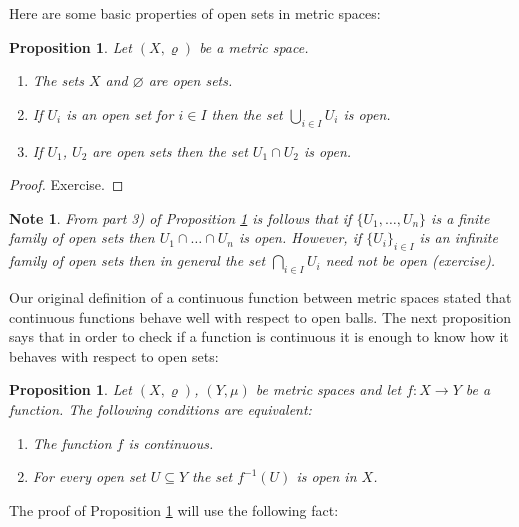 \documentclass[11pt, letterpaper, oneside]{report}
\theoremstyle{pplain}
\newtheorem{proposition}[theorem]{Proposition}
\newtheorem{ITERMVALUE THM}[theorem]{Intermediate Value Theorem}
\newtheorem{HEINEBOREL THM}[theorem]{Heine-Borel Theorem}
\newtheorem{UMETR THM}[theorem]{Urysohn Metrization Theorem}
\newtheorem{UMETR2 THM}[theorem]{Urysohn Metrization Theorem (v.2)}
\theoremstyle{ddefinition}
\newtheorem{note}[theorem]{Note}
\theoremstyle{nnn}
\newtheorem{TDA NN}[theorem]{Topological Data Analysis. }
\theoremstyle{eexercise}
\begin{document}
Here are some basic properties of open sets in metric spaces:

\begin{proposition}
\label{OPEN SET PROP}
Let $(X, \varrho)$ be a metric space. 
\begin{enumerate}
\item The sets $X$ and $\varnothing$ are open sets. 
\item If $U_{i}$ is an open set  for $i\in I$ then the set $\bigcup_{i\in I} U_{i}$ is open. 
\item If $U_{1}$,  $U_{2}$ are open sets then the set $U_{1}\cap U_{2}$  is open.
\end{enumerate}
\end{proposition}


\begin{proof}
Exercise.
\end{proof}

\begin{note}
From part 3) of Proposition \ref{OPEN SET PROP} is follows that if $\{U_{1}, \dots, U_{n}\}$ is a 
finite family of open sets then $U_{1}\cap \dots \cap U_{n}$ is open. However, if
$\{U_{i}\}_{i\in I}$ is an infinite family of open sets then in general the set $\bigcap_{i\in I} U_{i}$ 
need not be open (exercise).   
\end{note}



Our original definition of a continuous function between metric spaces stated  that 
continuous functions behave well with respect to open balls.
The next proposition says that in order to check if a function is continuous it is enough to 
know how it behaves with respect to open sets:

\begin{proposition}
\label{CONT FUNCT VIA OPEN SETS PROP}
Let $(X, \varrho)$, $(Y, \mu)$ be metric spaces and let $f\colon X \to Y$ be a function. 
The following conditions are equivalent:
\begin{enumerate}
\item The function $f$ is continuous. 
\item For every open set $U\subseteq Y$ the set $f^{-1}(U)$ is open in $X$.  
\end{enumerate}
\end{proposition}

The proof of Proposition \ref{CONT FUNCT VIA OPEN SETS PROP} will use the following fact:
\end{document}
